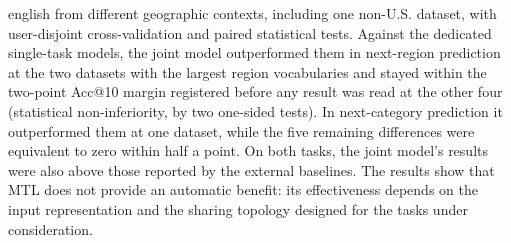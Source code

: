 \begin{resumo}[Abstract]
\begin{otherlanguage*}{english}
            from different geographic contexts, including one non-U.S. dataset, with
            user-disjoint cross-validation and paired statistical tests.
            Against the dedicated single-task models, the joint model outperformed
            them in next-region prediction at the two datasets with the largest region
            vocabularies and stayed within the two-point Acc@10 margin registered
            before any result was read at the other four (statistical
            non-inferiority, by two one-sided tests). In next-category prediction it
            outperformed them at one dataset, while the five remaining differences were
            equivalent to zero within half a point. On both tasks, the joint
            model's results were also above those reported by the external baselines.
            The results show that MTL does not provide an automatic benefit: its
            effectiveness depends on the input representation and the sharing topology
            designed for the tasks under consideration.


\end{otherlanguage*}
\end{resumo}

